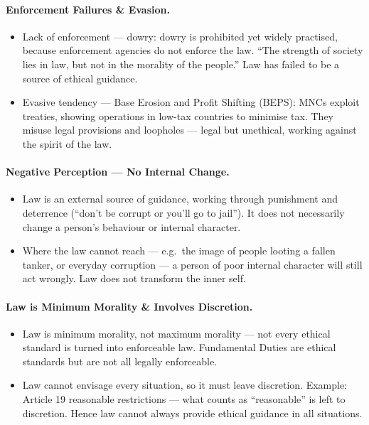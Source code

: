 \paragraph{Enforcement Failures \& Evasion.}
\begin{itemize}
\item Lack of enforcement --- dowry: dowry is prohibited yet widely practised, because enforcement agencies do not enforce the law. ``The strength of society lies in law, but not in the morality of the people.'' Law has failed to be a source of ethical guidance.
\item Evasive tendency --- Base Erosion and Profit Shifting (BEPS): MNCs exploit treaties, showing operations in low-tax countries to minimise tax. They misuse legal provisions and loopholes --- legal but unethical, working against the spirit of the law.
\end{itemize}

\paragraph{Negative Perception --- No Internal Change.}
\begin{CriticalPoint}
\begin{itemize}
\item Law is an external source of guidance, working through punishment and deterrence (``don't be corrupt or you'll go to jail''). It does not necessarily change a person's behaviour or internal character.
\item Where the law cannot reach --- e.g.\ the image of people looting a fallen tanker, or everyday corruption --- a person of poor internal character will still act wrongly. Law does not transform the inner self.
\end{itemize}
\end{CriticalPoint}

\paragraph{Law is Minimum Morality \& Involves Discretion.}
\begin{KeyConcept}
\begin{itemize}
\item Law is minimum morality, not maximum morality --- not every ethical standard is turned into enforceable law. Fundamental Duties are ethical standards but are not all legally enforceable.
\item Law cannot envisage every situation, so it must leave discretion. Example: Article 19 reasonable restrictions --- what counts as ``reasonable'' is left to discretion. Hence law cannot always provide ethical guidance in all situations.
\end{itemize}
\end{KeyConcept}

